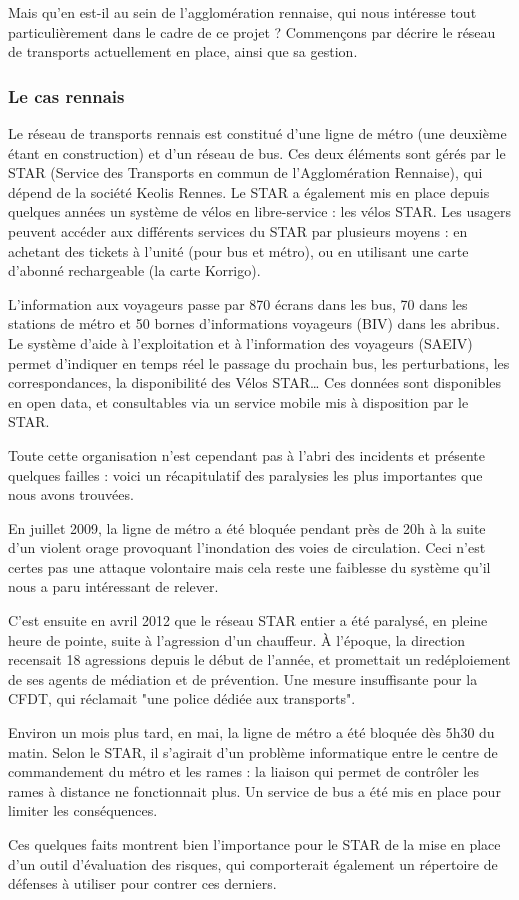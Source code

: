 	Mais qu'en est-il au sein de l'agglomération rennaise, qui nous intéresse tout particulièrement dans le cadre de ce projet ? Commençons par décrire le réseau de transports actuellement en place, ainsi que sa gestion.
		
		\subsubsection{ Le cas rennais }

	Le réseau de transports rennais est constitué d'une ligne de métro (une deuxième étant en construction) et d'un réseau de bus. Ces deux éléments sont gérés par le STAR (Service des Transports en commun de l'Agglomération Rennaise), qui dépend de la société Keolis Rennes. Le STAR a également mis en place depuis quelques années un système de vélos en libre-service : les vélos STAR. Les usagers peuvent accéder aux différents services du STAR par plusieurs moyens : en achetant des tickets à l'unité (pour bus et métro), ou en utilisant une carte d'abonné rechargeable (la carte Korrigo). 
	
	L'information aux voyageurs passe par 870 écrans dans les bus, 70 dans les stations de métro et 50 bornes d’informations voyageurs (BIV) dans les abribus. Le système d’aide à l’exploitation et à l’information des voyageurs (SAEIV) permet d’indiquer en temps réel le passage du prochain bus, les perturbations, les correspondances, la disponibilité des Vélos STAR… Ces données sont disponibles en open data, et consultables via un service mobile mis à disposition par le STAR.

	Toute cette organisation n'est cependant pas à l'abri des incidents et présente quelques failles : voici un récapitulatif des paralysies les plus importantes que nous avons trouvées.

	En juillet 2009, la ligne de métro a été bloquée pendant près de 20h à la suite d'un violent orage provoquant l'inondation des voies de circulation. Ceci n'est certes pas une attaque volontaire mais cela reste une faiblesse du système qu'il nous a paru intéressant de relever. 

	C'est ensuite en avril 2012 que le réseau STAR entier a été paralysé, en pleine heure de pointe, suite à l'agression d'un chauffeur. À l'époque, la direction recensait 18 agressions depuis le début de l'année, et promettait un redéploiement de ses agents de médiation et de prévention. Une mesure insuffisante pour la CFDT, qui réclamait "une police dédiée aux transports".

	Environ un mois plus tard, en mai, la ligne de métro a été bloquée dès 5h30 du matin. Selon le STAR, il s’agirait d’un problème informatique entre le centre de commandement du métro et les rames : la liaison qui permet de contrôler les rames à distance ne fonctionnait plus. Un service de bus a été mis en place pour limiter les conséquences.

	Ces quelques faits montrent bien l'importance pour le STAR de la mise en place d'un outil d'évaluation des risques, qui comporterait également un répertoire de défenses à utiliser pour contrer ces derniers.
